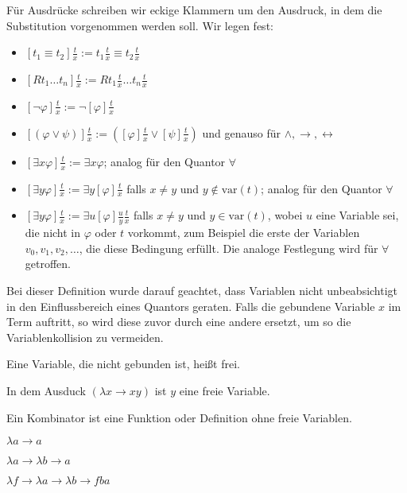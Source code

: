 Für Ausdrücke schreiben wir eckige Klammern um den Ausdruck, in dem die Substitution vorgenommen werden soll. Wir legen fest:

\begin{itemize}
	\item $[t_1\equiv t_2]\frac{t}{x} := t_1\frac{t}{x} \equiv t_2\frac{t}{x}$
	\item $[Rt_1\ldots t_n]\frac{t}{x} := Rt_1\frac{t}{x}\ldots t_n\frac{t}{x}$
	\item $[\neg\varphi]\frac{t}{x} := \neg [\varphi]\frac{t}{x}$
	\item $[(\varphi \lor \psi)]\frac{t}{x} := ([\varphi]\frac{t}{x} \lor [\psi]\frac{t}{x})$ und genauso für $\land, \rightarrow, \leftrightarrow$
	\item $[\exists x \varphi]\frac{t}{x} := \exists x \varphi$; analog für den Quantor $\forall$
	\item $[\exists y \varphi]\frac{t}{x} := \exists y [\varphi] \frac{t}{x}$ falls $x\neq y$ und $y\notin \mathrm{var}(t)$; analog für den Quantor $\forall$
	\item $[\exists y \varphi]\frac{t}{x} := \exists u [\varphi] \frac{u}{y} \frac{t}{x}$ falls $x\neq y$ und $y\in \mathrm{var}(t)$, wobei $u$ eine Variable sei, die nicht in $\varphi$ oder $t$ vorkommt, zum Beispiel die erste der Variablen $v_0,v_1,v_2,\ldots$, die diese Bedingung erfüllt. Die analoge Festlegung wird für $\forall$ getroffen.
\end{itemize}

Bei dieser Definition wurde darauf geachtet, dass Variablen nicht unbeabsichtigt in den Einflussbereich eines Quantors geraten. Falls die gebundene Variable $x$ im Term auftritt, so wird diese zuvor durch eine andere ersetzt, um so die Variablenkollision zu vermeiden.

\begin{definition}
	Eine Variable, die nicht gebunden ist, heißt frei.
\end{definition}

\begin{beispiel}
	In dem Ausduck $(\lambda x \rightarrow x y)$ ist $y$ eine freie Variable.
\end{beispiel}

\begin{definition}[Kombinator]
	Ein Kombinator ist eine Funktion oder Definition ohne freie Variablen.
\end{definition}

\begin{beispiel}
	\begin{bspenum}
		\item $\lambda a \rightarrow a$
		\item $\lambda a \rightarrow \lambda b \rightarrow a$
		\item $\lambda f \rightarrow \lambda a \rightarrow \lambda b \rightarrow f b a$
	\end{bspenum}
\end{beispiel}
